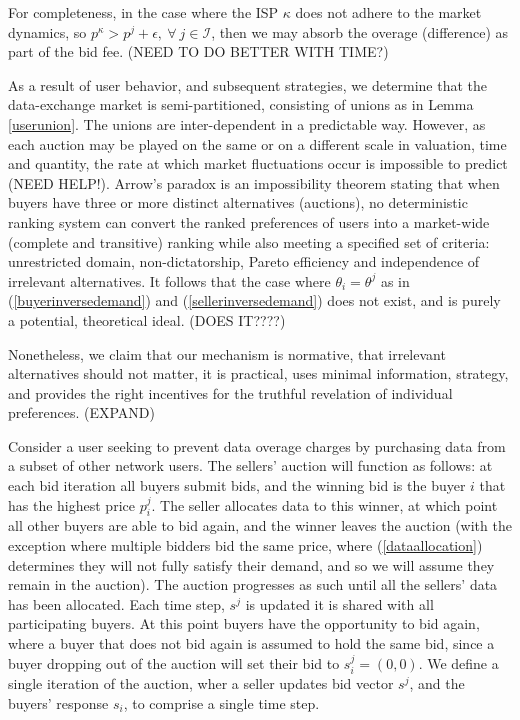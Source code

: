 \documentclass[12pt]{article}
\theoremstyle{definition}
\newcommand{\mcI}{\mathcal{I}}
\begin{document}
\begin{multicols}{2}
For completeness, in the case where the ISP $\kappa$ 
does not adhere to the market dynamics, so $p^\kappa > p^j +
\epsilon, \ \forall \ j \in\mcI$, then we may absorb the overage (difference) as part of the
bid fee.
(NEED TO DO BETTER WITH TIME?)

As a result of user behavior, and subsequent strategies, we determine that the data-exchange market is
semi-partitioned, consisting of unions as in Lemma \ref{userunion}. The unions are inter-dependent in a predictable way. However, as
each auction may be played on the same or on a different scale in
valuation, time and quantity, the rate at which market fluctuations occur is
impossible to predict (NEED HELP!). 
Arrow's paradox is an impossibility theorem stating that when buyers have three
or more distinct alternatives (auctions), no deterministic ranking system can
convert the ranked preferences of users into a market-wide (complete
and transitive) ranking while also meeting a specified set of criteria:
unrestricted domain, non-dictatorship, Pareto efficiency and independence of
irrelevant alternatives. It follows that the case where
$\theta_i = \theta^j$ as in (\ref{buyerinversedemand}) and
(\ref{sellerinversedemand}) does not exist, and is purely a potential,
theoretical ideal. (DOES IT????)

Nonetheless, we claim that our mechanism is normative, that irrelevant
alternatives should not matter, it is practical, uses minimal information,
strategy, and provides the right incentives for the truthful revelation of individual preferences. 
(EXPAND)

Consider a user seeking to prevent
data overage charges by purchasing data from a subset of other network users.
The sellers' auction will function as follows: at each bid iteration all buyers
submit bids, and the winning bid is the buyer $i$ that has the highest price
$p_i^j$. The seller allocates
data to this winner, at which point all other buyers are able to bid again, and
the winner leaves the auction (with the exception where multiple bidders bid
the same price, where (\ref{dataallocation}) determines they will not fully
satisfy their demand, and so we will assume they remain in the auction). The auction progresses as such until all the
sellers' data has been allocated. 
Each time step, $s^j$ is updated it is shared with all
participating buyers. At this point buyers have the opportunity to bid again,
where a buyer that does not bid again is assumed to hold the same bid, since a
buyer dropping out of the auction will set their bid to $s_i^j=(0,0)$. We
define a single iteration of the auction, wher a seller updates bid vector
$s^j$, and the buyers' response $s_i$, to comprise a single time step. 


\end{multicols}
\end{document}
